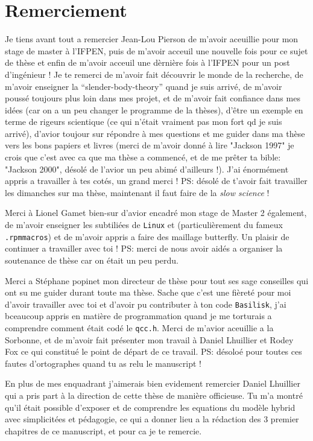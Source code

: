 \chapter*{\centering Remerciement}
\noindent 
Je tiens avant tout a remercier Jean-Lou Pierson de m'avoir aceuillie pour mon stage de master à l'IFPEN, puis de m'avoir acceuil une nouvelle fois pour ce sujet de thèse et enfin de m'avoir acceuil une dèrnière fois à l'IFPEN pour un post d'ingénieur ! 
Je te remerci de m'avoir fait découvrir le monde de la recherche, 
de m'avoir enseigner la ``slender-body-theory'' quand je suis arrivé, 
de m'avoir poussé toujours plus loin dans mes projet, 
et de m'avoir fait confiance dans mes idées  (car on a un peu changer le programme de la thèses),
d'être un exemple en terme de rigeurs scientique (ce qui n'était vraiment pas mon fort qd je suis arrivé), 
d'avior toujour sur répondre à mes questions et me guider dans ma thèse vers les bons papiers et livres (merci de m'avoir donné à lire "Jackson 1997" je crois que c'est avec ca que ma thèse a commencé, et de me prêter ta bible: "Jackson 2000", désolé de l'avior un peu abimé d'ailleurs !).
J'ai énormément  appris a travailler à tes cotés, un grand merci !
PS: désolé de t'avoir fait travailler les dimanches sur ma thèse,  maintenant il faut faire de la \textit{slow science} ! 

Merci à Lionel Gamet bien-sur d'avior encadré mon stage de Master 2 également, de m'avoir enseigner les subtiliées de \texttt{Linux} et (particulièrement du fameux \texttt{.rpmmacros}) et de m'avoir appris a faire des maillage butterfly.  
Un plaisir de continuer a travailler avec toi ! 
PS: merci de nous avoir aidés a organiser la soutenance de thèse car on était un peu perdu. 
 
Merci a  Stéphane popinet mon directeur de thèse pour tout ses sage conseilles qui ont su me guider durant toute ma thèse. 
Sache que c'est une fièreté pour moi d'avoir travailler avec toi et d'avoir pu contributer à ton code \texttt{Basilisk}, j'ai bceaucoup appris en matière de programmation quand je me torturais a comprendre comment était codé le \texttt{qcc.h}. 
Merci de m'avior aceuillie a la Sorbonne, et de m'avoir fait présenter mon travail à Daniel Lhuillier et Rodey Fox ce qui constitué le point de départ de ce travail.  
PS: désoloé pour toutes ces fautes d'ortographes quand tu as relu le manuscript ! 

En plus de mes enquadrant j'aimerais bien evidement remercier Daniel Lhuillier qui a pris part à la direction de cette thèse de manière  officieuse. 
Tu m'a montré qu'il était possible d'exposer et de comprendre les equations du modèle hybrid avec simplicitées et pédagogie, ce qui a donner lieu a la rédaction des 3 premier chapitres de ce manuscript, et pour ca je te remercie. 

